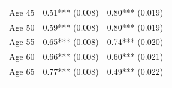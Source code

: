 \documentclass[]{article}
\begin{document}
\begin{longtable}[c]{@{}rrr@{}}
\begin{minipage}[t]{0.24\columnwidth}
Age 45
\strut\end{minipage} &
\begin{minipage}[t]{0.24\columnwidth}\raggedleft\strut
0.51*** (0.008)
\strut\end{minipage} &
\begin{minipage}[t]{0.24\columnwidth}\raggedleft\strut
0.80*** (0.019)
\strut\end{minipage}\tabularnewline
\begin{minipage}[t]{0.24\columnwidth}\raggedleft\strut
Age 50
\strut\end{minipage} &
\begin{minipage}[t]{0.24\columnwidth}\raggedleft\strut
0.59*** (0.008)
\strut\end{minipage} &
\begin{minipage}[t]{0.24\columnwidth}\raggedleft\strut
0.80*** (0.019)
\strut\end{minipage}\tabularnewline
\begin{minipage}[t]{0.24\columnwidth}\raggedleft\strut
Age 55
\strut\end{minipage} &
\begin{minipage}[t]{0.24\columnwidth}\raggedleft\strut
0.65*** (0.008)
\strut\end{minipage} &
\begin{minipage}[t]{0.24\columnwidth}\raggedleft\strut
0.74*** (0.020)
\strut\end{minipage}\tabularnewline
\begin{minipage}[t]{0.24\columnwidth}\raggedleft\strut
Age 60
\strut\end{minipage} &
\begin{minipage}[t]{0.24\columnwidth}\raggedleft\strut
0.66*** (0.008)
\strut\end{minipage} &
\begin{minipage}[t]{0.24\columnwidth}\raggedleft\strut
0.60*** (0.021)
\strut\end{minipage}\tabularnewline
\begin{minipage}[t]{0.24\columnwidth}\raggedleft\strut
Age 65
\strut\end{minipage} &
\begin{minipage}[t]{0.24\columnwidth}\raggedleft\strut
0.77*** (0.008)
\strut\end{minipage} &
\begin{minipage}[t]{0.24\columnwidth}\raggedleft\strut
0.49*** (0.022)
\strut\end{minipage}\tabularnewline
\begin{minipage}[t]{0.24\columnwidth}\raggedleft\strut

\end{minipage}
\end{longtable}
\end{document}
